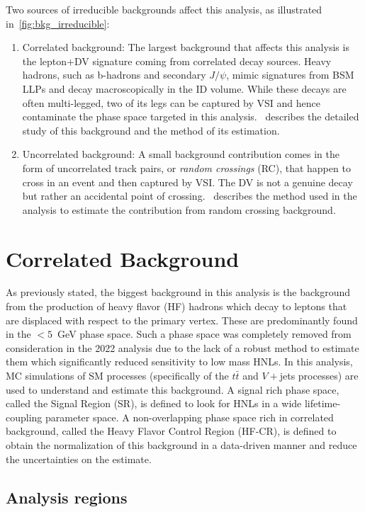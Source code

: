 Two sources of irreducible backgrounds affect this analysis, as illustrated in~\cref{fig:bkg_irreducible}:
\begin{enumerate}
    \item Correlated background: The largest background that affects this analysis is the lepton+DV signature coming from correlated decay sources. Heavy hadrons, such as b-hadrons and secondary $J/\psi$, mimic signatures from BSM LLPs and decay macroscopically in the ID volume. While these decays are often multi-legged, two of its legs can be captured by VSI and hence contaminate the phase space targeted in this analysis.~ describes the detailed study of this background and the method of its estimation.

    \item Uncorrelated background: A small background contribution comes in the form of uncorrelated track pairs, or \textit{random crossings} (RC), that happen to cross in an event and then captured by VSI. The DV is not a genuine decay but rather an accidental point of crossing.~ describes the method used in the analysis to estimate the contribution from random crossing background.
\end{enumerate}

\section{Correlated Background}\label{sec:corr_bkg}
As previously stated, the biggest background in this analysis is the background from the production of heavy flavor (HF) hadrons which decay to leptons that are displaced with respect to the primary vertex. These are predominantly found in the \mdv$<5$~GeV phase space. Such a phase space was completely removed from consideration in the 2022 analysis due to the lack of a robust method to estimate them which significantly reduced sensitivity to low mass HNLs. In this analysis, MC simulations of SM processes (specifically of the $t\bar{t}$ and $V+$jets processes) are used to understand and estimate this background. A signal rich phase space, called the Signal Region (SR), is defined to look for HNLs in a wide lifetime-coupling parameter space. A non-overlapping phase space rich in correlated background, called the Heavy Flavor Control Region (HF-CR), is defined to obtain the normalization of this background in a data-driven manner and reduce the uncertainties on the estimate.

\subsection{Analysis regions}

